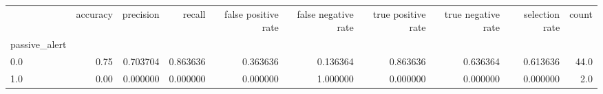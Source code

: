 \begin{tabular}{lrrrrrrrrr}
\toprule
{} &  accuracy &  precision &    recall &  false positive rate &  false negative rate &  true positive rate &  true negative rate &  selection rate &  count \\
passive\_alert &           &            &           &                      &                      &                     &                     &                 &        \\
\midrule
0.0           &      0.75 &   0.703704 &  0.863636 &             0.363636 &             0.136364 &            0.863636 &            0.636364 &        0.613636 &   44.0 \\
1.0           &      0.00 &   0.000000 &  0.000000 &             0.000000 &             1.000000 &            0.000000 &            0.000000 &        0.000000 &    2.0 \\
\bottomrule
\end{tabular}
